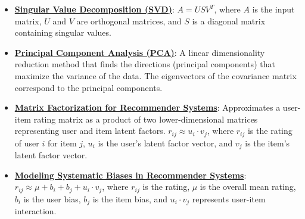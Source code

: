 \documentclass{article}%
\begin{document}
\begin{itemize}[leftmargin=*]%
\item \href{https://purdue.brightspace.com/d2l/common/assets/pdfjs-d2l-dist/1.0.14-legacy/web/viewer.html?file=\%2Fcontent\%2Fenforced\%2F1095467-wl.202510.CS.24300.001\%2F11L2-svd-pca-recommender.pdf\%3Fou\%3D1095467\&lang=en-us\&container=d2l-fileviewer-rendered-pdf\&fullscreen=d2l-fileviewer-rendered-pdf-dialog\&height=667#page=10}{\textbf{Singular Value Decomposition (SVD)}}: $A = USV^T$, where $A$ is the input matrix, $U$ and $V$ are orthogonal matrices, and $S$ is a diagonal matrix containing singular values.%
\item \href{https://purdue.brightspace.com/d2l/common/assets/pdfjs-d2l-dist/1.0.14-legacy/web/viewer.html?file=\%2Fcontent\%2Fenforced\%2F1095467-wl.202510.CS.24300.001\%2F11L2-svd-pca-recommender.pdf\%3Fou\%3D1095467\&lang=en-us\&container=d2l-fileviewer-rendered-pdf\&fullscreen=d2l-fileviewer-rendered-pdf-dialog\&height=667#page=17}{\textbf{Principal Component Analysis (PCA)}}: A linear dimensionality reduction method that finds the directions (principal components) that maximize the variance of the data. The eigenvectors of the covariance matrix correspond to the principal components.%
\item \href{https://purdue.brightspace.com/d2l/common/assets/pdfjs-d2l-dist/1.0.14-legacy/web/viewer.html?file=\%2Fcontent\%2Fenforced\%2F1095467-wl.202510.CS.24300.001\%2F11L2-svd-pca-recommender.pdf\%3Fou\%3D1095467\&lang=en-us\&container=d2l-fileviewer-rendered-pdf\&fullscreen=d2l-fileviewer-rendered-pdf-dialog\&height=667#page=36}{\textbf{Matrix Factorization for Recommender Systems}}: Approximates a user-item rating matrix as a product of two lower-dimensional matrices representing user and item latent factors. $r_{ij} \approx u_i \cdot v_j$, where $r_{ij}$ is the rating of user $i$ for item $j$, $u_i$ is the user's latent factor vector, and $v_j$ is the item's latent factor vector.%
\item \href{https://purdue.brightspace.com/d2l/common/assets/pdfjs-d2l-dist/1.0.14-legacy/web/viewer.html?file=\%2Fcontent\%2Fenforced\%2F1095467-wl.202510.CS.24300.001\%2F11L2-svd-pca-recommender.pdf\%3Fou\%3D1095467\&lang=en-us\&container=d2l-fileviewer-rendered-pdf\&fullscreen=d2l-fileviewer-rendered-pdf-dialog\&height=667#page=44}{\textbf{Modeling Systematic Biases in Recommender Systems}}: $r_{ij} \approx \mu + b_i + b_j + u_i \cdot v_j$, where $r_{ij}$ is the rating, $\mu$ is the overall mean rating, $b_i$ is the user bias, $b_j$ is the item bias, and $u_i \cdot v_j$ represents user-item interaction.%
\end{itemize}%
\end{document}
